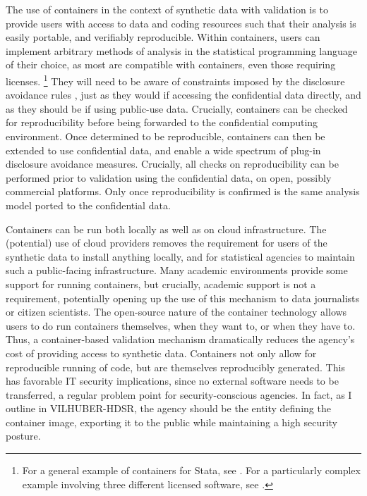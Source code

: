 \documentclass[12pt]{article}
\begin{document}
The use of containers in the context of synthetic data with validation is to provide users with access to data and coding resources such that their analysis is easily portable, and verifiably reproducible. Within containers, users can implement arbitrary methods of analysis in the statistical programming language of their choice, as most are compatible with containers, even those requiring licenses.%
%
\footnote{For a general example of containers for Stata, see \citet{docker-stata}. For a particularly complex example involving three different licensed software, see \citet{lars_vilhuber_aeadataeditordocker-aer-2023-0700_2024}.}
%
They will need to be aware of constraints imposed by the disclosure avoidance rules \citep{abowd_economic_2015}, just as they would if accessing the confidential data directly, and as they should be if using public-use data. Crucially, containers can  be checked for reproducibility before being forwarded to the confidential computing environment. Once determined to be reproducible, containers can then be extended  to use confidential data, and enable a wide spectrum of plug-in disclosure avoidance measures. Crucially, all checks on reproducibility can be performed prior to validation using the confidential data, on open, possibly commercial platforms. Only once reproducibility is confirmed is the same analysis model ported to the confidential data. 

Containers can be run both locally as well as on cloud infrastructure. The (potential) use of cloud providers removes the requirement for users of the synthetic data to install anything locally, and for statistical agencies to maintain such a public-facing infrastructure. Many academic environments provide some support for running containers, but crucially, academic support is not a requirement, potentially opening up the use of this mechanism to data journalists or citizen scientists. The open-source nature of the container technology allows users to do run containers themselves, when they want to, or when they have to. Thus, a container-based validation mechanism  dramatically reduces the agency's cost of providing access to synthetic data.
%
Containers not only allow for reproducible running of code, but are themselves reproducibly generated. This has favorable IT security implications, since no external software needs to be transferred, a regular problem point for security-conscious agencies. In fact, as I outline in VILHUBER-HDSR, the agency should be the entity defining the container image, exporting it to the public while maintaining a high security posture.
\end{document}
